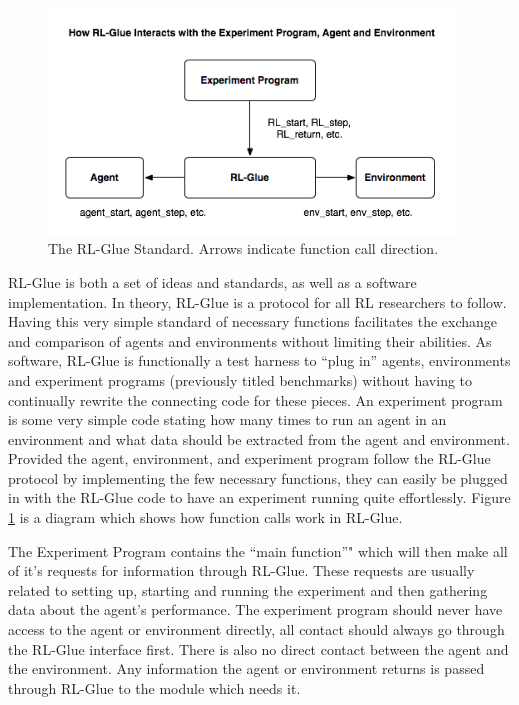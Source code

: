 \documentclass[11pt]{article}
\begin{document}
\begin{figure}
\label{fig1}
\begin{center}
\includegraphics[height=60mm]{images/glue_connections_no_shadow.png}
\caption{The RL-Glue Standard. Arrows indicate function call direction.}
\end{center}
\end{figure}

RL-Glue is both a set of ideas and standards, as well as a software implementation. In theory, RL-Glue is a protocol for all RL researchers to follow. Having this very simple standard of necessary functions facilitates the exchange and comparison of agents and environments without limiting their abilities. As software, RL-Glue is functionally a test harness to ``plug in'' agents, environments and experiment programs (previously titled benchmarks) without having to continually rewrite the connecting code for these pieces. An experiment program is some very simple code stating how many times to run an agent in an environment and what data should be extracted from the agent and environment. Provided the agent, environment, and experiment program follow the RL-Glue protocol by implementing the few necessary functions, they can easily be plugged in with the RL-Glue code to have an experiment running quite effortlessly. Figure \ref{fig1} is a diagram which shows how function calls work in RL-Glue.



The Experiment Program contains the ``main function''" which will then make all of it's requests for information through RL-Glue. These requests are usually related to setting up, starting and running the experiment and then gathering data about the agent's performance. The experiment program should never have access to the agent or environment directly, all contact should always go through the RL-Glue interface first.  There is also no direct contact between the agent and the environment. Any information the agent or environment returns is passed through RL-Glue to the module which needs it.  
\end{document}
